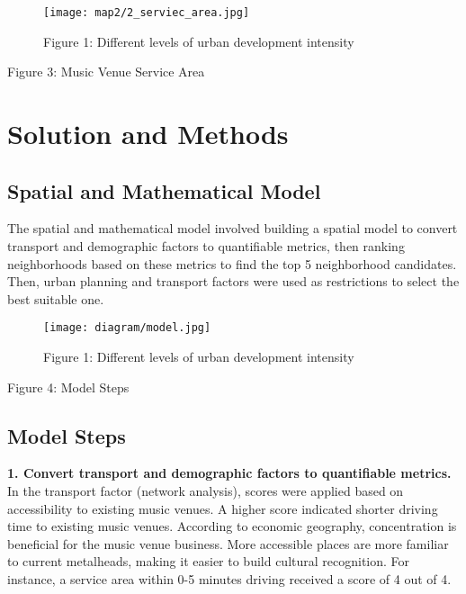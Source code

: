 \documentclass[11pt]{article}
\begin{document}
\begin{figure}[H]
\begin{center}
\centering
\texttt{[image: map2/2\_serviec\_area.jpg]}
\caption{Figure 1: Different levels of urban development intensity}
\label{fig:figure1}
\end{center}
\end{figure}

\begin{center}
\centering
Figure 3: Music Venue Service Area
\end{center}

\newpage



\section{Solution and Methods}
\subsection{Spatial and Mathematical Model}
The spatial and mathematical model involved building a spatial model to convert transport and demographic factors to quantifiable metrics, then ranking neighborhoods based on these metrics to find the top 5 neighborhood candidates. Then, urban planning and transport factors were used as restrictions to select the best suitable one.


\begin{figure}[H]
\begin{center}
\centering
\texttt{[image: diagram/model.jpg]}
\caption{Figure 1: Different levels of urban development intensity}
\label{fig:figure1}
\end{center}
\end{figure}

\begin{center}
\centering
Figure 4: Model Steps
\end{center}

\subsection{Model Steps}


\textbf{1. Convert transport and demographic factors to quantifiable metrics.}\\
In the transport factor (network analysis), scores were applied based on accessibility to existing music venues. A higher score indicated shorter driving time to existing music venues. According to economic geography, concentration is beneficial for the music venue business. More accessible places are more familiar to current metalheads, making it easier to build cultural recognition. For instance, a service area within 0-5 minutes driving received a score of 4 out of 4.
\end{document}
